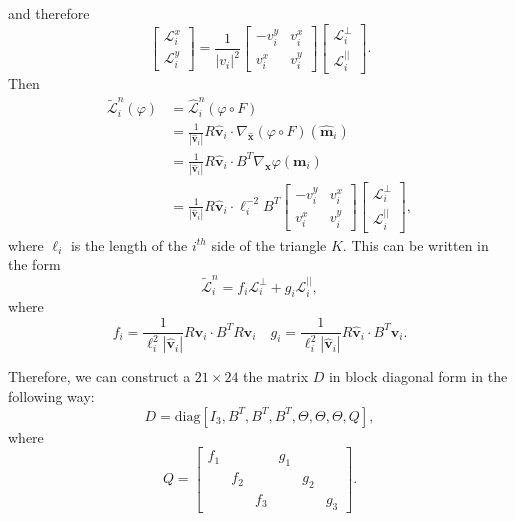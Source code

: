 and therefore
\begin{equation*}
  \begin{bmatrix}
    \mathcal{L}^{x}_i \\ \mathcal{L}^{y}_i
  \end{bmatrix} = \frac{1}{|v_i|^2}
  \begin{bmatrix} -v^y_i & v^x_i \\ v^x_i & v^y_i \end{bmatrix}
  \begin{bmatrix}
    \mathcal{L}^{\perp}_i \\ \mathcal{L}^{||}_i
  \end{bmatrix}.
\end{equation*}
Then
\begin{align*}
  \tilde{\mathcal{L}}^n_i(\varphi) &= \hat{\mathcal{L}}^n_i(\varphi\circ F) \\
  &= \frac{1}{|\hat{\mathbf{v}}_i|}R \hat{\mathbf{v}}_i \cdot
    \nabla_{\hat{\mathbf{x}}}(\varphi \circ F)(\hat{\mathbf{m}}_i) \\
  &= \frac{1}{|\hat{\mathbf{v}}_i|}R \hat{\mathbf{v}}_i \cdot B^T
    \nabla_{\mathbf{x}} \varphi(\mathbf{m}_i) \\
  &= \frac{1}{|\hat{\mathbf{v}}_i|}R \hat{\mathbf{v}}_i \cdot \ell_i^{-2} B^T
  \begin{bmatrix} -v^y_i & v^x_i \\ v^x_i & v^y_i \end{bmatrix}
  \begin{bmatrix}
    \mathcal{L}^{\perp}_i \\ \mathcal{L}^{||}_i
  \end{bmatrix},
\end{align*}
where $\ell_i$ is the length of the $i^{th}$ side of the triangle $K$. This can be written in the form
\begin{equation*}
  \tilde{\mathcal{L}}_i^n = f_i \mathcal{L}^{\perp}_i + g_i \mathcal{L}^{||}_i,
\end{equation*}
where
\begin{equation*}
  f_i = \frac{1}{\ell_i^2 |\hat{\mathbf{v}}_i|}R \hat{\mathbf{v}}_i \cdot B^T
    R\mathbf{v}_i \quad
  g_i = \frac{1}{\ell_i^2 |\hat{\mathbf{v}}_i|}R \hat{\mathbf{v}}_i \cdot B^T
    \mathbf{v}_i .
\end{equation*}

Therefore, we can construct a $21\times 24$ the matrix $D$ in block diagonal
form in the following way:
\begin{equation*}
  D = \text{diag}[I_3, B^T, B^T, B^T, \Theta, \Theta, \Theta, Q],
\end{equation*}
where
\begin{equation*}
  Q = \left[\begin{array}{ccc|ccc}
    f_1 & & & g_1 & & \\
    & f_2 & & & g_2 &\\
    & & f_3 & & & g_3
  \end{array}\right].
\end{equation*}

